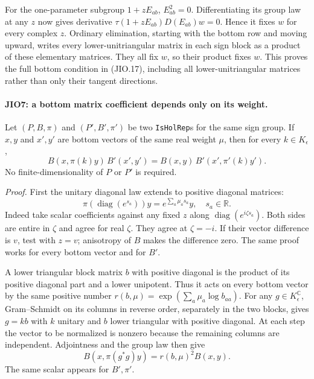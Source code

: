 For the one-parameter subgroup \(1+zE_{ab}\), \(E_{ab}^2=0\).
Differentiating its group law at any \(z\) now gives derivative
\(\tau(1+zE_{ab})D(E_{ab})w=0\).  Hence it fixes \(w\)
for every complex \(z\).  Ordinary elimination, starting with
the bottom row and moving upward, writes every lower-unitriangular
matrix in each sign block as a product of these elementary
matrices.  They all fix \(w\), so their product fixes \(w\).
This proves the full bottom condition in (JIO.17), including
all lower-unitriangular matrices rather than only their tangent
directions.

\paragraph{JIO7: a bottom matrix coefficient depends only on its weight.}
\label{claim:JIO7}
Let \((P,B,\pi)\) and \((P',B',\pi')\) be two
\texttt{IsHolRep}s for the same sign group.  If \(x,y\) and
\(x',y'\) are bottom vectors of the same real weight \(\mu\), then
for every \(k\in K_\epsilon\),
\[
 B(x,\pi(k)y)\,B'(x',y')
             =B(x,y)\,B'(x',\pi'(k)y').
 \tag{JIO.19}
\]
No finite-dimensionality of \(P\) or \(P'\) is required.

\emph{Proof.}
First the unitary diagonal law extends to positive diagonal
matrices:
\[
 \pi(\operatorname{diag}(e^{s_a}))y
                         =e^{\sum_a\mu_as_a}y,\quad s_a\in\mathbb R.
 \tag{JIO.20}
\]
Indeed take scalar coefficients against any fixed \(z\) along
\(\operatorname{diag}(e^{i\zeta s_a})\).
Both sides are entire in \(\zeta\) and agree for real \(\zeta\).
They agree at \(\zeta=-i\).  If their vector difference is \(v\),
test with \(z=v\); anisotropy of \(B\) makes the difference zero.
The same proof works for every bottom vector and for \(B'\).

A lower triangular block matrix \(b\) with positive diagonal
is the product of its positive diagonal part and a lower
unipotent.  Thus it acts on every bottom vector by the same
positive number
\(r(b,\mu)=\exp(\sum_a\mu_a\log b_{aa})\).
For any \(g\in K_\epsilon^{\mathbb C}\), Gram--Schmidt on its
columns in reverse order, separately in the two blocks, gives
\(g=kb\) with \(k\) unitary and \(b\) lower triangular with
positive diagonal.  At each step the vector to be normalized
is nonzero because the remaining columns are independent.
Adjointness and the group law then give
\[
             B(x,\pi(g^*g)y)=r(b,\mu)^2B(x,y).
 \tag{JIO.21}
\]
The same scalar appears for \(B',\pi'\).

